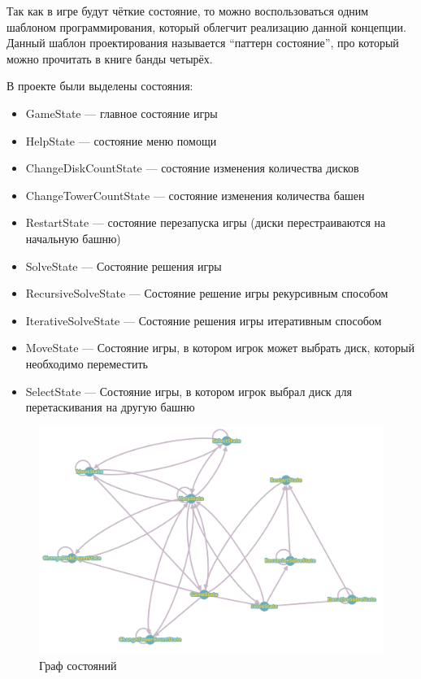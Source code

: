 Так как в игре будут чёткие состояние, то можно воспользоваться одним шаблоном
программирования, который облегчит реализацию данной концепции. Данный шаблон
проектирования называется ``паттерн состояние'', про который можно прочитать в
книге банды четырёх.\cite{book:2584808}

В проекте были выделены состояния:

\begin{itemize}
	\item GameState --- главное состояние игры
	\item HelpState --- состояние меню помощи
	\item ChangeDiskCountState --- состояние изменения количества дисков
	\item ChangeTowerCountState --- состояние изменения количества башен
	\item RestartState --- состояние перезапуска игры (диски перестраиваются на
	      начальную башню)
	\item SolveState --- Состояние решения игры
	\item RecursiveSolveState --- Состояние решение игры рекурсивным способом
	\item IterativeSolveState --- Состояние решения игры итеративным способом
	\item MoveState --- Состояние игры, в котором игрок может выбрать диск,
	      который необходимо переместить
	\item SelectState --- Состояние игры, в котором игрок выбрал диск для
	      перетаскивания на другую башню
\end{itemize}

\begin{figure}[H]
	\begin{center}
		\includegraphics[width=\textwidth]{images/states.png}
		\caption{Граф состояний}
	\end{center}
\end{figure}

